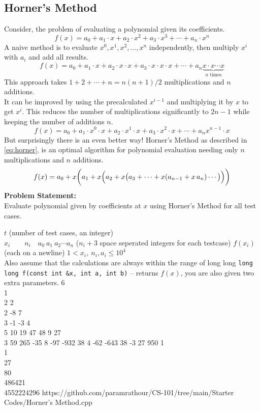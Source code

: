 \subsection{Horner's Method}
Consider, the problem of evaluating a polynomial given its coefficients.
\begin{equation*}
	f(x)=a_{0}+a_{1}\cdot x+a_{2}\cdot x^{2}+a_{3}\cdot x^{3}+\cdots +a_{n}\cdot x^{n}
\end{equation*}
A naive method is to evaluate $x^0, x^1, x^2, \ldots, x^n$ independently, then multiply $x^i$ with $a_i$ and add all results.
\begin{equation*}
	f(x)=a_{0}+a_{1}\cdot x+a_{2}\cdot x\cdot x+a_{3}\cdot x\cdot x\cdot x+\cdots +a_{n}\underbrace{x\cdot x\cdots x}_{n\text{ times}}
\end{equation*}
This approach takes $1+2+\cdots+n=n(n+1)/2$ multiplications and $n$ additions.\\
It can be improved by using the precalculated $x^{i-1}$ and multiplying it by $x$ to get $x^{i}$. This reduces the number of multiplications significantly to $2n-1$ while keeping the number of additions $n$.
\begin{equation*}
	f(x)=a_{0}+a_{1}\cdot x^0\cdot x+a_{2}\cdot x^1\cdot x+a_{3}\cdot x^2\cdot x+\cdots +a_{n}x^{n-1}\cdot x
\end{equation*}
But surprisingly there is an even better way! Horner's Method as described in \ref{eq:horner}, is an optimal algorithm for polynomial evaluation needing only $n$ multiplications and $n$ additions.
\begin{equation}{\label{eq:horner}}
	f(x)=a_{0}+x\bigg(a_{1}+x\Big(a_{2}+x\big(a_{3}+\cdots +x(a_{n-1}+x\,a_{n})\cdots \big)\Big)\bigg)
\end{equation}
\textbf{Problem Statement:}\\
Evaluate polynomial given by coefficients at $x$ using Horner's Method for all test cases.
\begin{testcasesFunction}
	{$t$ \hfill(number of test cases, an integer)\\
	$x_i\qquad n_i \quad a_0\ a_1\ a_2 \cdots a_n$ \hfill($n_i+3$ space seperated integers for each testcase)}
	{$f(x_i)$\hfill(each on a newline)}
	{$1 < x_i,\ n_i, a_i \leq 10^{4}$\\
	Also assume that the calculations are always within the range of long long}
	{\texttt{long long f(const int \&x, int a, int b)} -- returns $f(x)$, you are also given two extra parameters.}
	{6\\1\\2 2\\2 -8 7\\3 -1 -3 4\\5 10 19 47 48 9 27\\3 59 265 -35 8 -97 -932 38 4 -62 -643 38 -3 27 950}
	{1\\1\\27\\80\\486421\\4552224296}
	{https://github.com/paramrathour/CS-101/tree/main/Starter Codes/Horner's Method.cpp}
\end{testcasesFunction}

